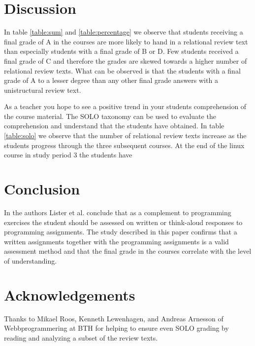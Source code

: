 \documentclass[twoside,twocolumn,a4paper,11pt,english]{article}
\begin{document}

\section{Discussion}

In table \ref{table:sum} and \ref{table:percentage}
we observe that students receiving a final grade of A in the courses are more likely to hand in a relational review text than especially students with a final grade of B or D. Few students received a final grade of C and therefore the grades are skewed towards a higher number of relational review texts. What can be observed is that the students with a final grade of A to a lesser degree than any other final grade answers with a unistructural review text.

As a teacher you hope to see a positive trend in your students comprehension of the course material. The SOLO taxonomy can be used to evaluate the comprehension and understand that the students have obtained. In table \ref{table:solo} we observe that the number of relational review texts increase as the students progress through the three subsequent courses. At the end of the linux course in study period 3 the students have




\section{Conclusion}

In \cite{lister2006not} the authors Lister et al. conclude that as a complement to programming exercises the student should be assessed on written or think-aloud responses to programming assignments. The study described in this paper confirms that a written assignments together with the programming assignments is a valid assessment method and that the final grade in the courses correlate with the level of understanding.




\section{Acknowledgements}

Thanks to Mikael Roos, Kenneth Lewenhagen, and Andreas Arnesson of Webbprogrammering at BTH for helping to ensure even SOLO grading by reading and analyzing a subset of the review texts.
\end{document}
